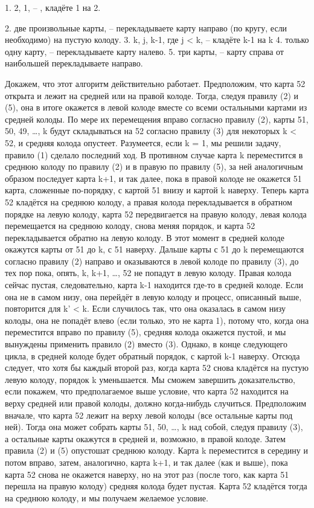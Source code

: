 1.  2, 1, -- , кладёте 1 на 2.


2. две произвольные карты, -- перекладываете карту направо (по кругу, если необходимо) на пустую колоду.
3. k, j, k-1, где j < k, -- кладёте  k-1 на k
4. только одну карту, -- перекладываете карту налево.
5. три карты, -- карту справа от наибольшей перекладываете направо.


  Докажем, что этот алгоритм действительно работает. Предположим, что карта 52 открыта и лежит на средней или на правой колоде. Тогда, следуя правилу (2) и (5), она в итоге окажется в левой колоде вместе со всеми остальными картами из средней колоды.  По мере их перемещения вправо согласно правилу (2), карты 51, 50, 49, …, k будут складываться на 52 согласно правилу (3) для некоторых k < 52, и средняя колода опустеет. Разумеется, если k = 1, мы решили задачу, правило (1) сделало последний ход.
В противном случае карта k переместится в среднюю колоду по правилу (2) и в правую по правилу (5), за ней аналогичным образом последует карта k+1, и так далее, пока в правой колоде не окажется 51 карта, сложенные по-порядку, с картой 51 внизу и картой k наверху.
   Теперь карта 52 кладётся на среднюю колоду, а правая колода перекладывается в обратном порядке на левую колоду, карта 52 передвигается на правую колоду, левая колода перемещается на среднюю колоду, снова меняя порядок, и карта 52 перекладывается обратно на левую колоду. В этот момент в средней колоде окажутся карты от 51 до k, с 51 наверху. Дальше карты с 51 до k перемещаются согласно правилу (2) направо и оказываются в левой колоде по правилу (3), до тех пор пока, опять, k, k+1, …, 52 не попадут в левую колоду.
    Правая колода сейчас пустая, следовательно, карта k-1 находится где-то в средней колоде. Если она не в самом низу, она перейдёт в левую колоду и процесс, описанный выше, повторится для k’ < k.  Если случилось так, что она оказалась в самом низу колоды, она не попадёт влево (если только, это не карта 1), потому что, когда она переместится вправо по правилу (5), средняя колода окажется пустой, и мы вынуждены применить правило (2) вместо (3). Однако, в конце следующего цикла, в средней колоде будет обратный порядок, с картой k-1 наверху. Отсюда следует, что хотя бы каждый второй раз, когда карта 52 снова кладётся на пустую левую колоду, порядок k уменьшается.
   Мы сможем завершить доказательство, если покажем, что предполагаемое выше условие, что карта 52 находится на верху средней или правой колоды, должно когда-нибудь случиться. Предположим вначале, что карта 52 лежит на верху левой колоды (все остальные карты под ней). Тогда она может собрать карты 51, 50, …, k над собой, следуя правилу (3), а  остальные карты окажутся в средней и, возможно, в правой колоде.
Затем правила (2) и (5) опустошат среднюю колоду. Карта k переместится в середину и потом вправо, затем, аналогично, карта k+1, и так далее (как и выше), пока карта 52 снова не окажется наверху, но на этот раз (после того, как карта 51 перешла на правую колоду) средняя колода будет пустая. Карта 52 кладётся тогда на среднюю колоду, и мы получаем желаемое условие.
                                
